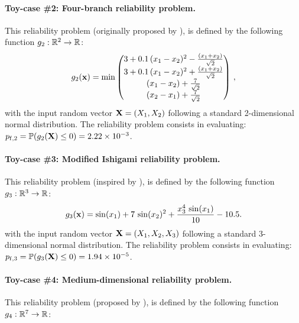 \paragraph{Toy-case \#2: Four-branch reliability problem.}
This reliability problem (originally proposed by \cite{waarts2000structural}), is defined by the following function $g_2: \mathbb{R}^2 \rightarrow \mathbb{R}$:
\begin{align}
  g_2({\bf x}) = \min \begin{pmatrix}
    3+0.1 \, (x_1-x_2)^2-\frac{(x_1+x_2)}{\sqrt{2}}\\
    3+0.1\, (x_1-x_2)^2+\frac{(x_1+x_2)}{\sqrt{2}}\\
    (x_1-x_2)+ \frac{7}{\sqrt{2}}\\
    (x_2-x_1)+ \frac{7}{\sqrt{2}}
  \end{pmatrix}\, ,
\end{align}
with the input random vector ${\bf X} = (X_1, X_2)$ following a standard 2-dimensional normal distribution. 
The reliability problem consists in evaluating: $p_{\mathrm{f}, 2} = \mathbb{P} ( g_2({\bf X}) \leq 0 ) =  2.22 \times 10^{-3}$.

\paragraph{Toy-case \#3: Modified Ishigami reliability problem.}
This reliability problem (inspired by \citealp{lemaitre_2015_PLI}), is defined by the following function $g_3: \mathbb{R}^3 \rightarrow \mathbb{R}$:
\begin{equation}
    g_3({\bf x}) = \sin(x_1) + 7 \, \sin(x_2)^2 + \frac{x_3^4 \, \sin(x_1)}{10} - 10.5.
\end{equation}
with the input random vector ${\bf X} = (X_1, X_2, X_3)$ following a standard 3-dimensional normal distribution. 
The reliability problem consists in evaluating: $p_{\mathrm{f}, 3} = \mathbb{P} ( g_3({\bf X}) \leq 0 ) =  1.94 \times 10^{-5}$.

\paragraph{Toy-case \#4: Medium-dimensional reliability problem.}
This reliability problem (proposed by \citealp{yun2018efficient}), is defined by the following function $g_4 : \mathbb{R}^7 \rightarrow \mathbb{R}$:

